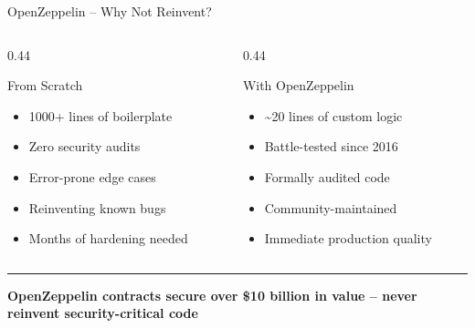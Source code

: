 \documentclass[8pt,aspectratio=169]{beamer}
\newcommand{\bottomnote}[1]{\vfill\vspace{-2mm}\textcolor{mllavender2}{\rule{\textwidth}{0.4pt}}\vspace{1mm}\footnotesize\textbf{#1}}
\begin{document}
\begin{frame}{OpenZeppelin -- Why Not Reinvent?}
  \begin{columns}[T]
    \begin{column}{0.44\textwidth}
      \begin{alertblock}{From Scratch}
        \begin{itemize}\setlength\itemsep{3pt}
          \item[\textcolor{mlred}{\textbullet}] 1000+ lines of boilerplate
          \item[\textcolor{mlred}{\textbullet}] Zero security audits
          \item[\textcolor{mlred}{\textbullet}] Error-prone edge cases
          \item[\textcolor{mlred}{\textbullet}] Reinventing known bugs
          \item[\textcolor{mlred}{\textbullet}] Months of hardening needed
        \end{itemize}
      \end{alertblock}
    \end{column}
    \begin{column}{0.44\textwidth}
      \begin{block}{With OpenZeppelin}
        \begin{itemize}\setlength\itemsep{3pt}
          \item[\textcolor{mlgreen}{\textbullet}] \textasciitilde20 lines of custom logic
          \item[\textcolor{mlgreen}{\textbullet}] Battle-tested since 2016
          \item[\textcolor{mlgreen}{\textbullet}] Formally audited code
          \item[\textcolor{mlgreen}{\textbullet}] Community-maintained
          \item[\textcolor{mlgreen}{\textbullet}] Immediate production quality
        \end{itemize}
      \end{block}
    \end{column}
  \end{columns}
  \vspace{6pt}
  \begin{center}
  \end{center}
  \bottomnote{OpenZeppelin contracts secure over \$10 billion in value -- never reinvent security-critical code}
\end{frame}
\end{document}
